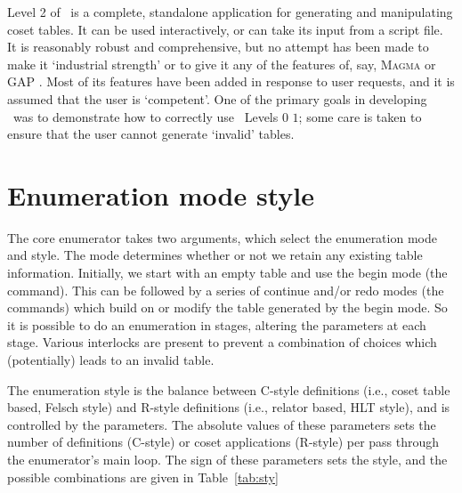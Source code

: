 


Level 2 of \ace\ is a complete, standalone application for generating and
  manipulating coset tables.
It can be used interactively, or can take its input from a script file.
It is reasonably robust and comprehensive, but no attempt has been made to
  make it `industrial strength' or to give it any of the features of, say,
  \textsc{Magma} \cite{BCP} or \textsf{GAP} \cite{Sch}.
Most of its features have been added in response to user requests, and it
  is assumed that the user is `competent'\kern-1.5pt.
One of the primary goals in developing \ace\ was to demonstrate how to
  correctly use \ace\ Levels $0$ \amp $1$; some care is taken to ensure
  that the user cannot generate `invalid' tables.

\section{Enumeration mode \amp style}\label{sec:style}

The core enumerator takes two arguments, which select the enumeration
  mode and style.
The mode determines whether or not we retain any existing table
  information.
Initially, we start with an empty table and use the begin mode (the
   command).
This can be followed by a series of continue and/or redo modes (the 
   \amp {} commands) which build on or modify the
  table generated by the begin mode.
So it is possible to do an enumeration in stages, altering the parameters
  at each stage.
Various interlocks are present to prevent a combination of choices which
  (potentially) leads to an invalid table.

The enumeration style is the balance between C-style definitions (i.e.,
  coset table based, Felsch style) and R-style definitions (i.e., relator
  based, HLT style), and is controlled by the  \amp {}
  parameters.
The absolute values of these parameters sets the number of definitions
  (C-style) or coset applications (R-style) per pass through the
  enumerator's main loop.
The sign of these parameters sets the style, and the possible combinations
  are given in Table~\ref{tab:sty}

